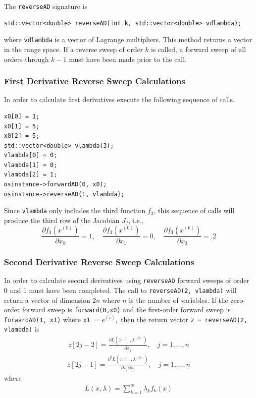 \documentclass[11pt]{article}
\newcommand{\D}[2]{ \frac{\partial #1}{\partial #2} }
\newcommand{\DD}[3]{ \frac{\partial^2 #1}{\partial #2 \partial #3} }
\renewcommand{\_}{{\char"5F}}
\renewcommand{\{}{{\char"7B}}
\renewcommand{\}}{{\char"7D}}
\renewcommand{\^}{{\char"0D}}
\renewcommand{\'}{{\char"0D}}
\begin{document}
\begin{enumerate}[Step 1:]
The {\tt reverseAD} signature is
\begin{verbatim}
std::vector<double> reverseAD(int k, std::vector<double> vdlambda);
\end{verbatim}
where {\tt vdlambda} is a vector of Lagrange multipliers.  This method returns a vector in the range space. If a reverse sweep of order $k$ is called, a forward sweep of all orders  through  $k -1$ must have been made prior to the call.

\subsubsection{First Derivative Reverse Sweep Calculations}

In order to calculate first derivatives execute the following sequence of calls.
\begin{verbatim}
x0[0] = 1;
x0[1] = 5;
x0[2] = 5;
std::vector<double> vlambda(3);
vlambda[0] = 0;
vlambda[1] = 0;
vlambda[2] = 1;
osinstance->forwardAD(0, x0);
osinstance->reverseAD(1, vlambda);
\end{verbatim}
Since {\tt vlambda} only includes
the third function $f_3$, this sequence of calls will produce the third row of the
Jacobian $J_f$, i.e.,
$$
\D{f_{3}(x^{(0)})}{x_{0}}  = 1,  \quad \D{f_{3}(x^{(0)})}{x_{1}}  = 0, \quad  \D{f_{3}(x^{(0)})}{x_{3}}  = .2
$$

\subsubsection{Second Derivative Reverse Sweep Calculations}

In order to calculate second derivatives using {\tt reverseAD} forward sweeps of order 0 and 1 must have been completed.  The call to {\tt reverseAD(2, vlambda)} will return a vector of dimension $2n$ where $n$ is the number of variables.  If the zero-order forward sweep is {\tt forward(0,x0)} and the first-order forward sweep is {\tt forwardAD(1, x1)} where {\tt x1} $= e^{(i)},$ then the return vector {\tt z = reverseAD(2,  vlambda)} is
\begin{eqnarray}
z[2j - 2]  = \D{L (x^{(0)}, \lambda^{(0)})}{x_{j}}, \quad j = 1, \ldots, n
\end{eqnarray}
\begin{eqnarray}
z[2j - 1]  = \DD{L(x^{(0)}, \lambda^{(0)})}{x_{i}}{x_{j}}, \quad j = 1, \ldots, n
\end{eqnarray}
where
\begin{eqnarray}
L (x, \lambda) = \sum_{k = 1}^{m} \lambda_{k} f_{k}(x)
\end{eqnarray}




\end{enumerate}
\end{document}
